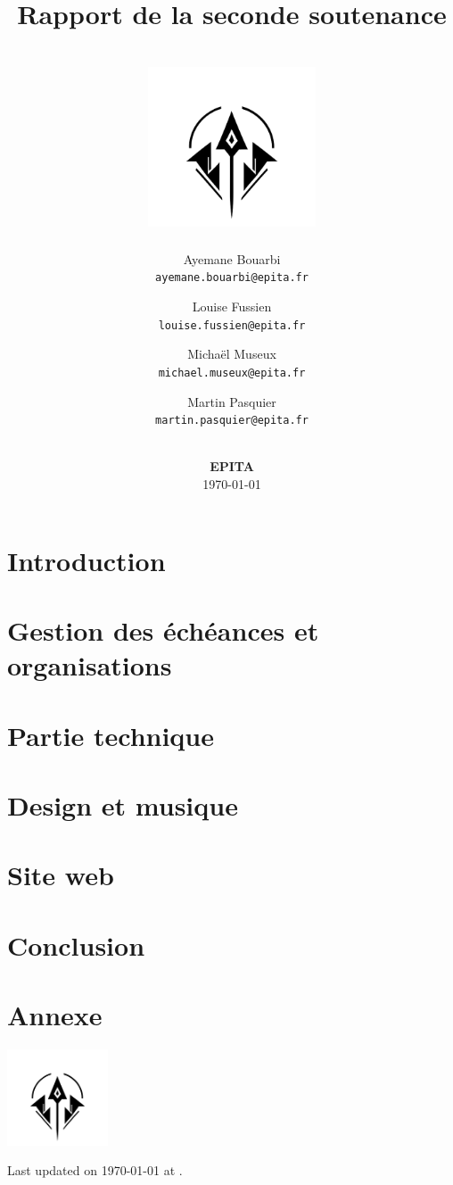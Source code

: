 \documentclass[12pt]{article}
\title{
    Rapport de la seconde soutenance \\
    \textbf{\gameName} \\
    \vspace{0.5cm}
    \includegraphics[width=5cm]{assets/logo.png}
    \vspace{4.2cm}
}
\author{
    Ayemane Bouarbi \\
    \texttt{ayemane.bouarbi@epita.fr}
    \vspace{0.5cm}\and
    Louise Fussien \\
    \texttt{louise.fussien@epita.fr}
    \vspace{0.5cm}\and
    Michaël Museux \\
    \texttt{michael.museux@epita.fr}
    \vspace{0.5cm}\and
    Martin Pasquier \\
    \texttt{martin.pasquier@epita.fr}
}
\date{
    \vspace{1.5cm}
    \textbf{\companyName} \\
    \vspace{0.3cm}
    \textbf{EPITA} \\
    \vspace{1.5cm}
    \today
}
\begin{document}
\begin{titlepage}
    \maketitle
    \thispagestyle{empty} %
\end{titlepage}

\newpage
\thispagestyle{empty}
\mbox{}

\newpage
\tableofcontents


\newpage
\section{Introduction}


\newpage
\section{Gestion des échéances et organisations}


\newpage
\section{Partie technique}


\newpage
\section{Design et musique}


\newpage
\section{Site web}



\newpage
\section{Conclusion}


\section{Annexe}

\centering
\vspace*{1.8cm}
\includegraphics[width=3cm]{assets/logo.png}

\vspace*{1cm}
Last updated on \today{} at \currenttime.
\end{document}
